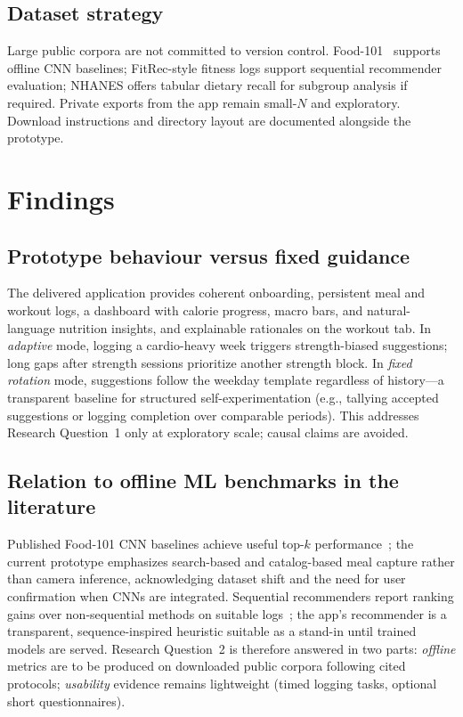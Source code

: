 \documentclass[conference]{IEEEtran}
\begin{document}
\subsection{Dataset strategy}
Large public corpora are not committed to version control. Food-101~\cite{bossard2014food} supports offline CNN baselines; FitRec-style fitness logs support sequential recommender evaluation; NHANES offers tabular dietary recall for subgroup analysis if required. Private exports from the app remain small-$N$ and exploratory. Download instructions and directory layout are documented alongside the prototype.

\section{Findings}
\subsection{Prototype behaviour versus fixed guidance}
The delivered application provides coherent onboarding, persistent meal and workout logs, a dashboard with calorie progress, macro bars, and natural-language nutrition insights, and explainable rationales on the workout tab. In \emph{adaptive} mode, logging a cardio-heavy week triggers strength-biased suggestions; long gaps after strength sessions prioritize another strength block. In \emph{fixed rotation} mode, suggestions follow the weekday template regardless of history---a transparent baseline for structured self-experimentation (e.g., tallying accepted suggestions or logging completion over comparable periods). This addresses Research Question~1 only at exploratory scale; causal claims are avoided.

\subsection{Relation to offline ML benchmarks in the literature}
Published Food-101 CNN baselines achieve useful top-$k$ performance~\cite{liu2016deepfood}; the current prototype emphasizes search-based and catalog-based meal capture rather than camera inference, acknowledging dataset shift and the need for user confirmation when CNNs are integrated. Sequential recommenders report ranking gains over non-sequential methods on suitable logs~\cite{ni2019modeling}; the app's recommender is a transparent, sequence-inspired heuristic suitable as a stand-in until trained models are served. Research Question~2 is therefore answered in two parts: \emph{offline} metrics are to be produced on downloaded public corpora following cited protocols; \emph{usability} evidence remains lightweight (timed logging tasks, optional short questionnaires).
\end{document}
